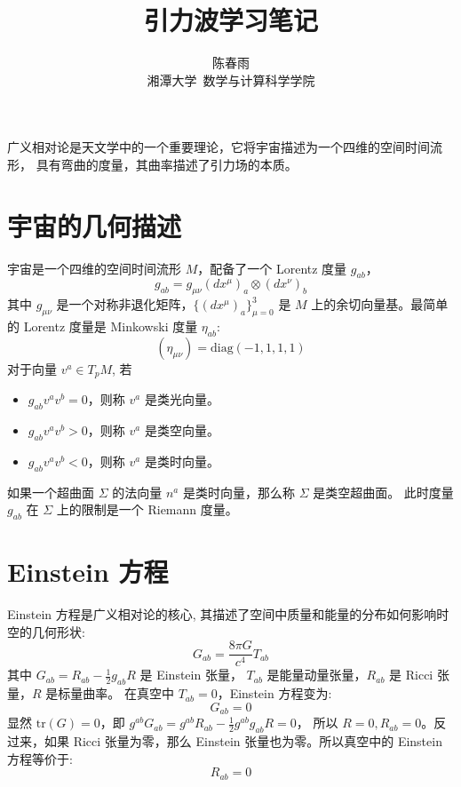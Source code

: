 \documentclass[lang=cn,a4paper,newtx]{elegantpaper}
\title{引力波学习笔记}
\author{陈春雨 \\ 湘潭大学\ 数学与计算科学学院}
\date{\zhdate{2024/9/18}}
\begin{document}
\maketitle

广义相对论是天文学中的一个重要理论，它将宇宙描述为一个四维的空间时间流形，
具有弯曲的度量，其曲率描述了引力场的本质。
\section{宇宙的几何描述}
宇宙是一个四维的空间时间流形 $M$，配备了一个 Lorentz 度量 $g_{ab}$，
$$
g_{ab} = g_{\mu\nu}(dx^{\mu})_a\otimes(dx^{\nu})_b
$$
其中 $g_{\mu\nu}$ 是一个对称非退化矩阵，$\{(dx^{\mu})_a\}_{\mu=0}^3$ 
是 $M$ 上的余切向量基。最简单的 Lorentz 度量是 Minkowski 度量 $\eta_{ab}$:
$$
(\eta_{\mu\nu}) = \mathrm{diag}(-1, 1, 1, 1)
$$
对于向量 $v^a \in T_pM$, 若 
\begin{itemize}
    \item $g_{ab}v^av^b = 0$，则称 $v^a$ 是类光向量。
    \item $g_{ab}v^av^b > 0$，则称 $v^a$ 是类空向量。
    \item $g_{ab}v^av^b < 0$，则称 $v^a$ 是类时向量。
\end{itemize}
如果一个超曲面 $\Sigma$ 的法向量 $n^a$ 是类时向量，那么称 $\Sigma$ 是类空超曲面。
此时度量 $g_{ab}$ 在 $\Sigma$ 上的限制是一个 Riemann 度量。

\section{Einstein 方程}
Einstein 方程是广义相对论的核心, 
其描述了空间中质量和能量的分布如何影响时空的几何形状:
$$
G_{ab} = \frac{8\pi G}{c^4}T_{ab} 
$$
其中 $G_{ab} = R_{ab} - \frac{1}{2}g_{ab}R$ 是 Einstein 张量，
$T_{ab}$ 是能量动量张量，$R_{ab}$ 是 Ricci 张量，$R$ 是标量曲率。
在真空中 $T_{ab} = 0$，Einstein 方程变为:
$$
G_{ab} = 0
$$
显然 $\mathrm{tr}(G) = 0$，即 
$g^{ab}G_{ab} = g^{ab}R_{ab} - \frac{1}{2}g^{ab}g_{ab}R = 0$，
所以 $R = 0, R_{ab} = 0$。反过来，如果 Ricci
张量为零，那么 Einstein 张量也为零。所以真空中的 Einstein 方程等价于:
$$
R_{ab} = 0
$$
\end{document}
